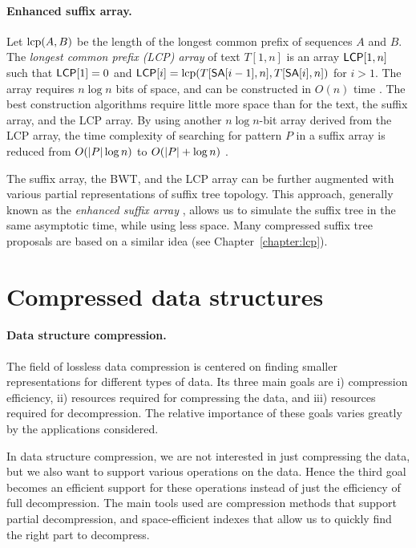\paragraph{Enhanced suffix array.}

Let $\operatorname{lcp}(A, B)$ be the length of the longest common prefix of sequences $A$ and $B$. The \emph{longest common prefix (LCP) array} of text $T[1,n]$ is an array $\mathsf{LCP}[1,n]$ such that $\mathsf{LCP}[1] = 0$ and $\mathsf{LCP}[i] = \operatorname{lcp}(T[\mathsf{SA}[i-1],n], T[\mathsf{SA}[i],n])$ for $i > 1$. The array requires $n \log n$ bits of space, and can be constructed in $O(n)$ time \cite{Kasai2001,Puglisi2008,Kaerkkaeinen2009,Gog2011,Fischer2011}. The best construction algorithms require little more space than for the text, the suffix array, and the LCP array. By using another $n \log n$-bit array derived from the LCP array, the time complexity of searching for pattern $P$ in a suffix array is reduced from $O(\lvert P \rvert \log n)$ to $O(\lvert P \rvert + \log n)$ \cite{Manber1993}.

The suffix array, the BWT, and the LCP array can be further augmented with various partial representations of suffix tree topology. This approach, generally known as the \emph{enhanced suffix array} \cite{Abouelhoda2004}, allows us to simulate the suffix tree in the same asymptotic time, while using less space. Many compressed suffix tree proposals are based on a similar idea (see Chapter~\ref{chapter:lcp}).


\section{Compressed data structures}\label{sect:compression}

\paragraph{Data structure compression.}

The field of lossless data compression is centered on finding smaller representations for different types of data. Its three main goals are i) compression efficiency, ii) resources required for compressing the data, and iii) resources required for decompression. The relative importance of these goals varies greatly by the applications considered.

In data structure compression, we are not interested in just compressing the data, but we also want to support various operations on the data. Hence the third goal becomes an efficient support for these operations instead of just the efficiency of full decompression. The main tools used are compression methods that support partial decompression, and space-efficient indexes that allow us to quickly find the right part to decompress.

